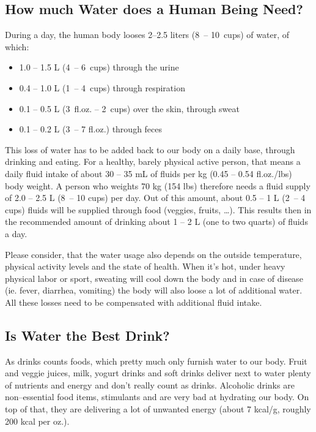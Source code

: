 \documentclass[../main.tex]{subfiles}
\begin{document}
\subsection{How much Water does a Human Being Need?}

During a day, the human body looses 2--2.5 liters (8\ -- 10\ cups) of water, of which:
\begin{itemize}
\item 1.0 -- 1.5 L (4\ -- 6\ cups) through the urine
\item 0.4 -- 1.0 L (1\ -- 4\ cups) through respiration
\item 0.1 -- 0.5 L (3\ fl.oz. -- 2\ cups) over the skin, through sweat
  \item 0.1 -- 0.2 L (3\ -- 7 fl.oz.) through feces
  \end{itemize}

  This loss of water has to be added back to our body on a daily base, through drinking and eating.
  For a healthy, barely physical active person, that means a daily fluid intake of about 30 -- 35 mL of fluids per kg (0.45 -- 0.54 fl.oz./lbs) body weight.
  A person who weights 70 kg (154 lbs) therefore needs a fluid supply of 2.0 -- 2.5 L (8\ -- 10 cups) per day.
  Out of this amount, about 0.5 -- 1 L (2\ -- 4 cups) fluids will be supplied through food (veggies, fruits, \ldots).
  This results then in the recommended amount of drinking about 1 -- 2 L (one to two quarts) of fluids a day.

  Please consider, that the water usage also depends on the outside temperature, physical activity levels and the state of health.
  When it's hot, under heavy physical labor or sport, sweating will cool down the body and
  in case of disease (ie. fever, diarrhea, vomiting) the body will also loose a lot of additional water.
  All these losses need to be compensated with additional fluid intake.

  \subsection{Is Water the Best Drink?}

  As drinks counts foods, which pretty much only furnish water to our body. 
  Fruit and veggie juices, milk, yogurt drinks and soft drinks deliver next to water plenty of nutrients and energy and  don't really count as drinks.
  Alcoholic drinks are non--essential food items, stimulants and are very bad at hydrating our body.
  On top of that, they are delivering a lot of unwanted energy (about 7 kcal/g, roughly 200 kcal per oz.).
\end{document}
